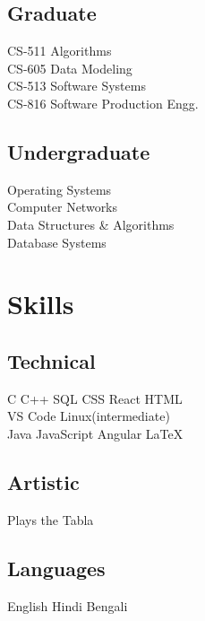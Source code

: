 \documentclass[]{deedy-resume-openfont}
\begin{document}
\begin{minipage}[t]{0.33\textwidth}
\subsection{Graduate}
CS-511  Algorithms \\
CS-605  Data Modeling \\
CS-513  Software Systems \\
CS-816 Software Production Engg. \\
\sectionsep

\subsection{Undergraduate}
Operating Systems \\
Computer Networks \\
Data Structures \& Algorithms \\
Database Systems \\



\section{Skills}
\subsection{Technical}
C \textbullet{} C++ \textbullet{} SQL \textbullet{} CSS \textbullet{} React \textbullet{} HTML \\
VS Code \textbullet{} Linux(intermediate) \\ 
Java \textbullet{} JavaScript \textbullet{} Angular\textbullet{}  \LaTeX\
\sectionsep

\subsection{Artistic}
Plays the Tabla \\
\sectionsep

\subsection{Languages}
English \textbullet{} Hindi \textbullet{} Bengali \\
\sectionsep




\end{minipage}
\end{document}
